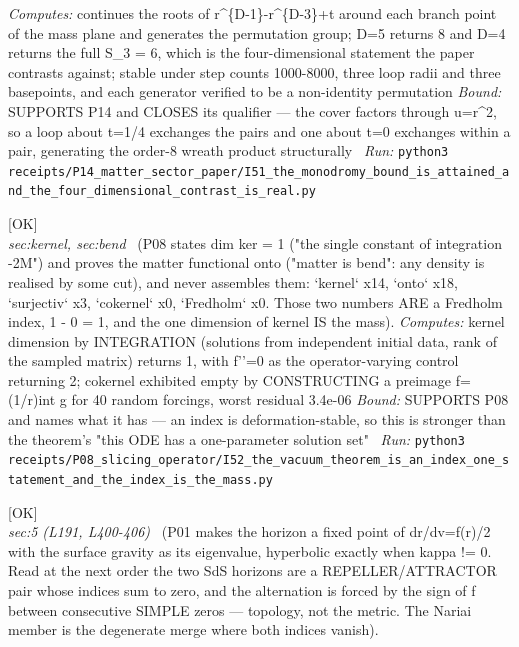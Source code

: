 \begin{description}
\emph{Computes:} continues the roots of r\textasciicircum{}\{D-1\}-r\textasciicircum{}\{D-3\}+t around each branch point of the mass plane and generates the permutation group; D=5 returns 8 and D=4 returns the full S\_3 = 6, which is the four-dimensional statement the paper contrasts against; stable under step counts 1000-8000, three loop radii and three basepoints, and each generator verified to be a non-identity permutation
 \emph{Bound:} SUPPORTS P14 and CLOSES its qualifier --- the cover factors through u=r\textasciicircum{}2, so a loop about t=1/4 exchanges the pairs and one about t=0 exchanges within a pair, generating the order-8 wreath product structurally
\ \emph{Run:} \texttt{python3 receipts/P14\_matter\_sector\_paper/I51\_the\_monodromy\_bound\_is\_attained\_and\_the\_four\_dimensional\_contrast\_is\_real.py}
\item[\label{rcpt:I52_the_vacuum_theorem_is_an_index_one_statement_and_the_index_is_the_mass}\texttt{I52\_the\_vacuum\_theorem\_is\_an\_index\_one\_statement\_and\_the\_index\_is\_the\_mass}]\hfill\textsf{[OK]}\\
\textit{sec:kernel, sec:bend} \ (P08 states dim ker = 1 ("the single constant of integration -2M") and proves the matter functional onto ("matter is bend": any density is realised by some cut), and never assembles them: `kernel` x14, `onto` x18, `surjectiv` x3, `cokernel` x0, `Fredholm` x0. Those two numbers ARE a Fredholm index, 1 - 0 = 1, and the one dimension of kernel IS the mass). 
\emph{Computes:} kernel dimension by INTEGRATION (solutions from independent initial data, rank of the sampled matrix) returns 1, with f''=0 as the operator-varying control returning 2; cokernel exhibited empty by CONSTRUCTING a preimage f=(1/r)int g for 40 random forcings, worst residual 3.4e-06
 \emph{Bound:} SUPPORTS P08 and names what it has --- an index is deformation-stable, so this is stronger than the theorem's "this ODE has a one-parameter solution set"
\ \emph{Run:} \texttt{python3 receipts/P08\_slicing\_operator/I52\_the\_vacuum\_theorem\_is\_an\_index\_one\_statement\_and\_the\_index\_is\_the\_mass.py}
\item[\label{rcpt:I53_the_two_horizons_are_a_repeller_attractor_pair_and_the_alternation_is_forced}\texttt{I53\_the\_two\_horizons\_are\_a\_repeller\_attractor\_pair\_and\_the\_alternation\_is\_forced}]\hfill\textsf{[OK]}\\
\textit{sec:5 (L191, L400-406)} \ (P01 makes the horizon a fixed point of dr/dv=f(r)/2 with the surface gravity as its eigenvalue, hyperbolic exactly when kappa != 0. Read at the next order the two SdS horizons are a REPELLER/ATTRACTOR pair whose indices sum to zero, and the alternation is forced by the sign of f between consecutive SIMPLE zeros --- topology, not the metric. The Nariai member is the degenerate merge where both indices vanish). 

\end{description}
